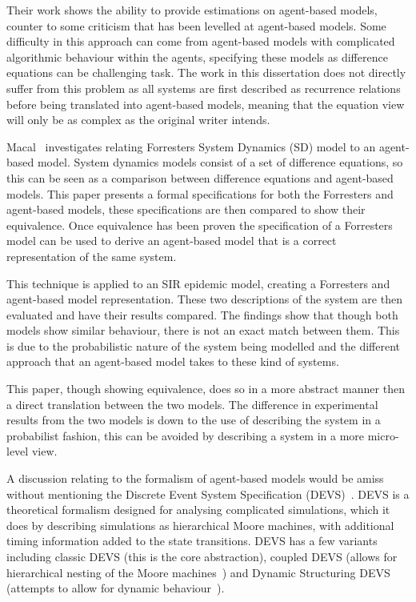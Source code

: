 \documentclass{article}
\begin{document}
Their work shows the ability to provide estimations on agent-based models, counter to some criticism that has been levelled at agent-based models. Some difficulty in this approach can come from agent-based models with complicated algorithmic behaviour within the agents, specifying these models as difference equations can be challenging task. The work in this dissertation does not directly suffer from this problem as all systems are first described as recurrence relations before being translated into agent-based models, meaning that the equation view will only be as complex as the original writer intends.  

Macal~\cite{abmtsd} investigates relating Forrester\textsc{}s System Dynamics (SD) model to an agent-based model. System dynamics models consist of a set of difference equations, so this can be seen as a comparison between difference equations and agent-based models. This paper presents a formal specifications for both the Forrester\textsc{}s and agent-based models, these specifications are then compared to show their equivalence. Once equivalence has been proven the specification of a Forrester\textsc{}s model can be used to derive an agent-based model that is a correct representation of the same system.

This technique is applied to an SIR epidemic model, creating a Forrester\textsc{}s and agent-based model representation. These two descriptions of the system are then evaluated and have their results compared. The findings show that though both models show similar behaviour, there is not an exact match between them. This is due to the probabilistic nature of the system being modelled and the different approach that an agent-based model takes to these kind of systems. 

This paper, though showing equivalence, does so in a more abstract manner then a direct translation between the two models. The difference in experimental results from the two models is down to the use of describing the system in a probabilist fashion, this can be avoided by describing a system in a more micro-level view.    

A discussion relating to the formalism of agent-based models would be amiss without mentioning the Discrete Event System Specification (DEVS)~\cite{introdevs}. DEVS is a theoretical formalism designed for analysing complicated simulations, which it does by describing simulations as hierarchical Moore machines, with additional timing information added to the state transitions. DEVS has a few variants including classic DEVS (this is the core abstraction), coupled DEVS (allows for hierarchical nesting of the Moore machines~\cite{coupleddevs}) and Dynamic Structuring DEVS (attempts to allow for dynamic behaviour~\cite{dynamicdevs}).
\end{document}
